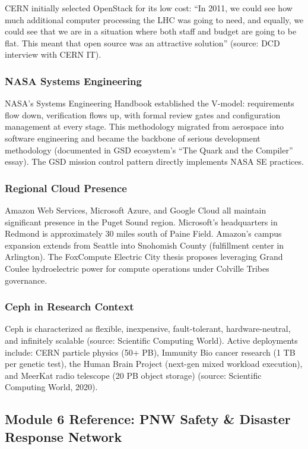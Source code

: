 \documentclass[11pt,letterpaper]{article}
\begin{document}
CERN initially selected OpenStack for its low cost: ``In 2011, we could see how much additional computer processing the LHC was going to need, and equally, we could see that we are in a situation where both staff and budget are going to be flat. This meant that open source was an attractive solution'' (source: DCD interview with CERN IT).

\subsubsection{NASA Systems Engineering}

NASA's Systems Engineering Handbook established the V-model: requirements flow down, verification flows up, with formal review gates and configuration management at every stage. This methodology migrated from aerospace into software engineering and became the backbone of serious development methodology (documented in GSD ecosystem's ``The Quark and the Compiler'' essay). The GSD mission control pattern directly implements NASA SE practices.

\subsubsection{Regional Cloud Presence}

Amazon Web Services, Microsoft Azure, and Google Cloud all maintain significant presence in the Puget Sound region. Microsoft's headquarters in Redmond is approximately 30 miles south of Paine Field. Amazon's campus expansion extends from Seattle into Snohomish County (fulfillment center in Arlington). The FoxCompute Electric City thesis proposes leveraging Grand Coulee hydroelectric power for compute operations under Colville Tribes governance.

\subsubsection{Ceph in Research Context}

Ceph is characterized as flexible, inexpensive, fault-tolerant, hardware-neutral, and infinitely scalable (source: Scientific Computing World). Active deployments include: CERN particle physics (50+ PB), Immunity Bio cancer research (1 TB per genetic test), the Human Brain Project (next-gen mixed workload execution), and MeerKat radio telescope (20 PB object storage) (source: Scientific Computing World, 2020).

\subsection{Module 6 Reference: PNW Safety \& Disaster Response Network}
\end{document}
